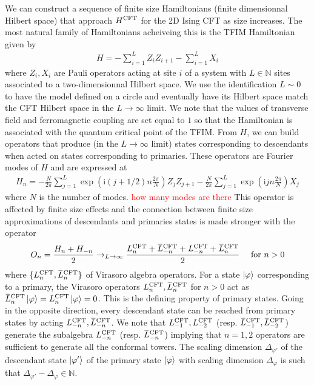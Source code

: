 \documentclass[10pt, a4paper]{article}
\begin{document}
{\begin{enumerate}
  We can construct a sequence of finite size Hamiltonians (finite dimensionnal Hilbert space) that approach $H^{\rm CFT}$ for the 2D Ising CFT as size increases. The most natural family of Hamiltonians acheiveing this is the TFIM Hamiltonian given by 
  \begin{align*}
    H=-\sum_{i=1}^L Z_i Z_{i+1}-\sum_{i=1}^L X_i
  \end{align*}
  where $Z_i, X_i$ are Pauli operators acting at site $i$ of a system with $L \in \mathbb{N}$ sites associated to a two-dimensionnal Hilbert space. We use the identification $L \sim 0$ to have the model defined on a circle and eventually have its Hilbert space match the CFT Hilbert space in the $L \to \infty$ limit. We note that the values of transverse field and ferromagnetic coupling are set equal to $1$ so that the Hamiltonian is associated with the quantum critical point of the TFIM. From $H$, we can build operators that produce (in the $L \to \infty$ limit) states corresponding to descendants when acted on states corresponding to primaries. These operators are Fourier modes of $H$ and are expressed at 
  \begin{align*}
    H_n = -\frac{N}{2 \pi} \sum_{j=1}^L \exp \left(\mathrm{i}(j+1 / 2) n \frac{2 \pi}{N}\right) Z_j Z_{j+1}-\frac{N}{2 \pi} \sum_{j=1}^L \exp \left(\mathrm{i} j n \frac{2 \pi}{N}\right) X_j
  \end{align*}
  where $N$ is the number of modes. \textcolor{red}{how many modes are there} This operator is affected by finite size effects and the connection between finite size approximations of descendants and primaries states is made stronger with the operator 
  \begin{align*}
    O_n=\frac{H_n+H_{-n}}{2} \to_{L\to \infty} \frac{L_n^{\rm C F T}+\bar{L}_{-n}^{\rm C F T}+L_{-n}^{\rm C F T}+\bar{L}_n^{\rm C F T}}{2} \quad \text { for } n>0
  \end{align*}
  where $\{L_n^{\rm CFT}, \bar{L}_{n}^{\rm CFT}\}$ of Virasoro algebra operators. For a state $\ket{\varphi}$ corresponding to a primary, the Virasoro operators $L_{n}^{\rm CFT}, \bar{L}_{n}^{\rm CFT}$ for $n > 0$ act as $\bar{L}_{n}^{\rm CFT} \ket{\varphi} = L_{n}^{\rm CFT} \ket{\varphi} = 0$. This is the defining property of primary states. Going in the opposite direction, every descendant state can be reached from primary states by acting $L_{-n}^{\rm CFT}, \bar{L}_{-n}^{\rm CFT}$. We note that $L_{-1}^{\rm CFT}, L_{-2}^{\rm CFT}$ (resp. $\bar{L}_{-1}^{\rm CFT}, \bar{L}_{-2}^{\rm CFT}$) generate the subalgebra $L_{-n}^{\rm CFT}$ (resp. $\bar{L}_{-n}^{\rm CFT}$) implying that $n=1, 2$ operators are sufficient to generate all the conformal towers. The scaling dimension $\Delta_{\varphi'}$ of the descendant state $\ket{\varphi'}$ of the primary state $\ket{\varphi}$ with scaling dimension $\Delta_\varphi$ is such that $\Delta_{\varphi'} - \Delta_\varphi \in \mathbb{N}$. \\
  

\end{enumerate}}
\end{document}
